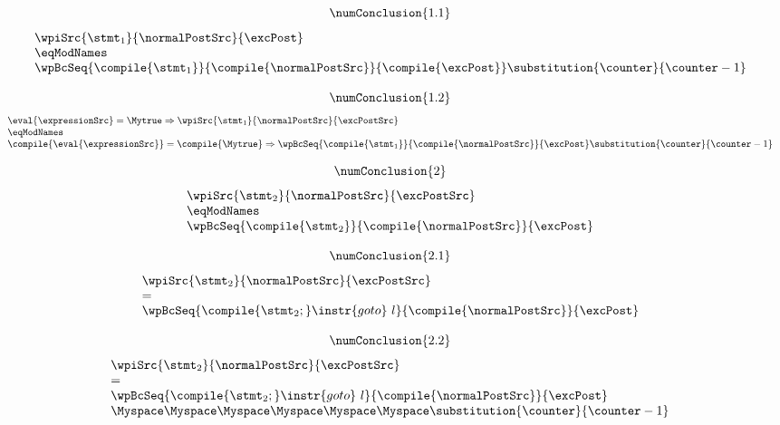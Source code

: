 \begin{pogEquiv}
\begin{description}
\begin{description}
$$\numConclusion{1.1}$$
$$ 
 \begin{array}{l}
      \wpiSrc{\stmt_1 }{\normalPostSrc }{ \excPost }\\  
      \eqModNames  \\ 
      \wpBcSeq{\compile{\stmt_1} }{\compile{\normalPostSrc} }{
\compile{ \excPost} }\substitution{\counter}{ \counter - 1}
  \end{array}
$$

$$\numConclusion{1.2}$$
$$ 
  \begin{array}{l}
     \eval{\expressionSrc } = \Mytrue \Rightarrow \wpiSrc{\stmt_1 }{\normalPostSrc }{ \excPostSrc }\\  
      \eqModNames  \\ 
      \compile{\eval{\expressionSrc }} = \compile{\Mytrue} \Rightarrow \wpBcSeq{\compile{\stmt_1} }{\compile{\normalPostSrc} }{
 \excPost }\substitution{\counter}{ \counter - 1}
  \end{array}
$$



$$\numConclusion{2} $$
$$
\begin{array}{l}
       \wpiSrc{\stmt_2 }{\normalPostSrc }{ \excPostSrc }\\ 
       \eqModNames  \\ 
       \wpBcSeq{\compile{\stmt_2} }{\compile{\normalPostSrc} }{
 \excPost }
  \end{array} $$



$$\numConclusion{2.1} $$
$$
\begin{array}{l}
       \wpiSrc{\stmt_2 }{\normalPostSrc }{ \excPostSrc }\\ 
       =  \\ 
       \wpBcSeq{\compile{\stmt_2;}\instr{ goto } \ l }{\compile{\normalPostSrc} }{ \excPost }
  \end{array} $$

 


$$\numConclusion{2.2}$$
$$\begin{array}{l}
       \wpiSrc{\stmt_2 }{\normalPostSrc }{ \excPostSrc }\\ 
       =  \\ 
       \wpBcSeq{\compile{\stmt_2;}\instr{goto} \ l }{\compile{\normalPostSrc} }{\excPost } \\
           \Myspace \Myspace  \Myspace \Myspace     \Myspace \Myspace  \substitution{\counter}{ \counter - 1}
  \end{array} $$








\end{description}
\end{description}
\end{pogEquiv}
